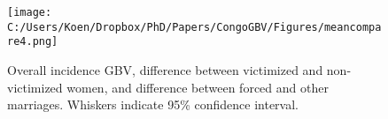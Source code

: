 \documentclass[11pt,a4paper]{scrartcl} %
\begin{document}
\begin{figure}
  \texttt{[image: C:/Users/Koen/Dropbox/PhD/Papers/CongoGBV/Figures/meancompare4.png]}
  \caption{Overall incidence GBV, difference between victimized and non-victimized women, and difference between forced and other marriages. Whiskers indicate 95\% confidence interval.}
  \label{fig:meancompare4}
\end{figure}



\end{document}

